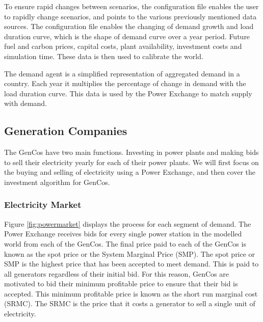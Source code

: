 To ensure rapid changes between scenarios, the configuration file enables the user to rapidly change scenarios, and points to the various previously mentioned data sources. The configuration file enables the changing of demand growth and load duration curve, which is the shape of demand curve over a year period. Future fuel and carbon prices, capital costs, plant availability, investment costs and simulation time. These data is then used to calibrate the world. 

The demand agent is a simplified representation of aggregated demand in a country. Each year it multiplies the percentage of change in demand with the load duration curve. This data is used by the Power Exchange to match supply with demand.

\subsection{Generation Companies} The GenCos have two main functions. Investing in power plants and making bids to sell their electricity yearly for each of their power plants. We will first focus on the buying and selling of electricity using a Power Exchange, and then cover the investment algorithm for GenCos.

\subsubsection{Electricity Market} \label{sssec:electricity_market} Figure \ref{fig:powermarket} displays the process for each segment of demand. The Power Exchange receives bids for every single power station in the modelled world from each of the GenCos. The final price paid to each of the GenCos is known as the spot price or the System Marginal Price (SMP). The spot price or SMP is the highest price that has been accepted to meet demand. This is paid to all generators regardless of their initial bid. For this reason, GenCos are motivated to bid their minimum profitable price to ensure that their bid is accepted. This minimum profitable price is known as the short run marginal cost (SRMC). The SRMC is the price that it costs a generator to sell a single unit of electricity. 

 


